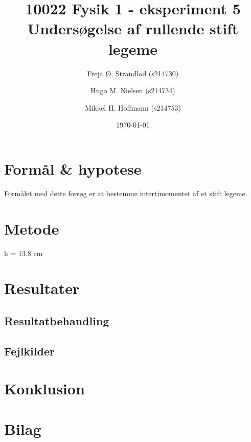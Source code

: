 \documentclass{article}
\title{
    10022 Fysik 1 - eksperiment 5 \\
    \large{Undersøgelse af rullende stift legeme}
}
\author{Freja Ø. Strandlod (s214730) \and Hugo M. Nielsen (s214734) \and Mikael H. Hoffmann (s214753)}
\date{\today}
\begin{document}
\maketitle

\section*{Formål \& hypotese}
Formålet med dette forsøg er at bestemme intertimomentet af et stift legeme. 

\section*{Metode}
h = 13.8 cm

\section*{Resultater}


\subsection*{Resultatbehandling}


\subsection*{Fejlkilder}


\section*{Konklusion}


\pagebreak

\appendix
\section{Bilag}
\end{document}
